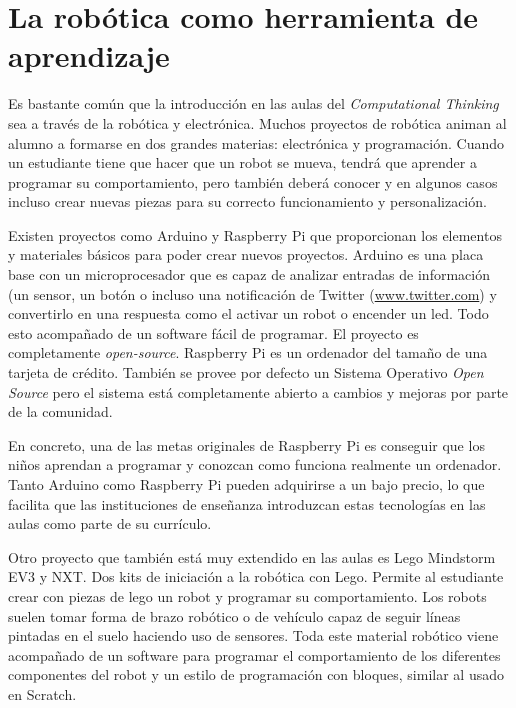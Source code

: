 \section{La robótica como herramienta de aprendizaje}
\label{sec:electronica-robotica}


Es bastante común que la introducción en las aulas del \emph{Computational Thinking} sea a través de la robótica y electrónica. Muchos proyectos de robótica animan al alumno a formarse en dos grandes materias: electrónica y programación. Cuando un estudiante tiene que hacer que un robot se mueva, tendrá que aprender a programar su comportamiento, pero también deberá conocer y en algunos casos incluso crear nuevas piezas para su correcto funcionamiento y personalización.

Existen proyectos como Arduino\cite{arduino} y Raspberry Pi\cite{raspberry-pi} que proporcionan los elementos y materiales básicos para poder crear nuevos proyectos. Arduino es una placa base con un microprocesador que es capaz de analizar entradas de información (un sensor, un botón o incluso una notificación de Twitter (\url{www.twitter.com}) y convertirlo en una respuesta como el activar un robot o encender un led. Todo esto acompañado de un software fácil de programar. El proyecto es completamente \emph{\gls{open-source}}. Raspberry Pi es un ordenador del tamaño de una tarjeta de crédito. También se provee por defecto un Sistema Operativo \emph{Open Source} pero el sistema está completamente abierto a cambios y mejoras por parte de la comunidad. 


En concreto, una de las metas originales de Raspberry Pi es conseguir que los niños aprendan a programar y conozcan como funciona realmente un ordenador. Tanto Arduino como Raspberry Pi pueden adquirirse a un bajo precio, lo que facilita que las instituciones de enseñanza introduzcan estas tecnologías en las aulas como parte de su currículo.


Otro proyecto que también está muy extendido en las aulas es Lego Mindstorm EV3 y NXT\cite{lego-mindstorm}. Dos kits de iniciación a la robótica con Lego. Permite al estudiante crear con piezas de lego un robot y programar su comportamiento. Los robots suelen tomar forma de brazo robótico o de vehículo capaz de seguir líneas pintadas en el suelo haciendo uso de sensores. Toda este material robótico viene acompañado de un software para programar el comportamiento de los diferentes componentes del robot y un estilo de programación con bloques\cite{lego-mindstorm-programar}, similar al usado en Scratch.

